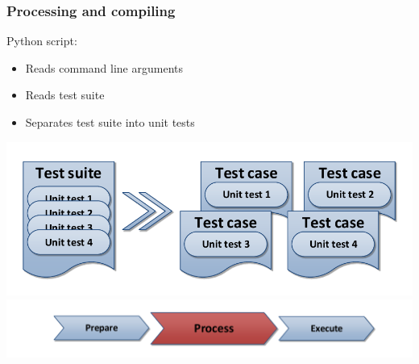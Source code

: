 \documentclass[british,10pt]{beamer}
\begin{document}
\begin{frame}\frametitle{Processing and compiling}
\vskip20pt
Python script:
\begin{itemize}
\item Reads command line arguments
\item Reads test suite
\item Separates test suite into unit tests
\end{itemize}
\vskip5pt
\centering
\includegraphics[width=.8\textwidth]{images/tbsplit2.pdf}
\vskip20pt
\includegraphics[width=.7\textwidth]{images/ppe2.pdf}
\end{frame}



\end{document}
